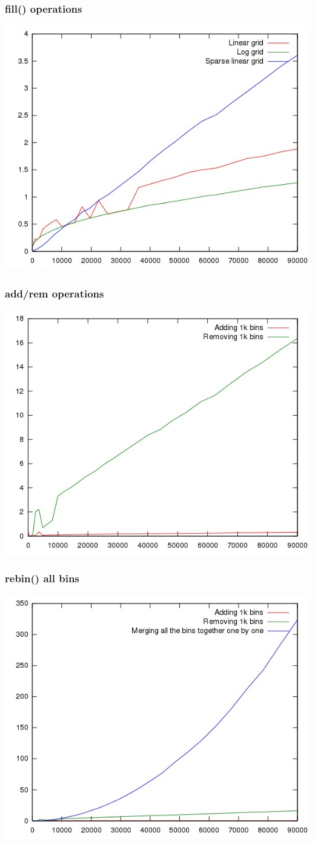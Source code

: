 \documentclass{beamer}
\begin{document}
  \begin{frame}
      \frametitle{fill() operations}
      \includegraphics[height=0.89\textheight]{1.jpg}
  \end{frame}
  \begin{frame}
    \frametitle{add/rem operations}
    \includegraphics[height=0.89\textheight]{2.jpg}
  \end{frame}
  \begin{frame}
    \frametitle{rebin() all bins}
    \includegraphics[height=0.89\textheight]{2a.jpg}
  \end{frame}
\end{document}
